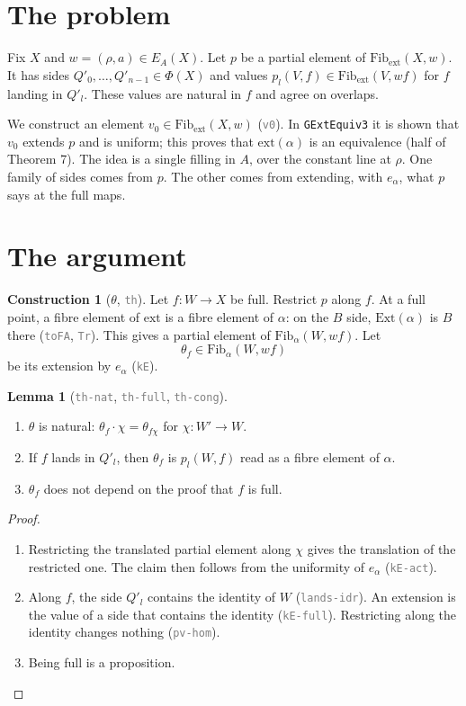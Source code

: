 \documentclass[11pt]{article}
\newcommand{\seg}[1]{\textcolor{gray}{\texttt{\small #1}}}
\newcommand{\Ext}{\mathrm{Ext}}
\newcommand{\ext}{\mathrm{ext}}
\newcommand{\Fib}{\mathrm{Fib}}
\theoremstyle{definition}
\newtheorem{lemma}[definition]{Lemma}
\newtheorem{construction}[definition]{Construction}
\theoremstyle{remark}
\begin{document}
\section*{The problem}

Fix $X$ and $w=(\rho,a)\in E_A(X)$. Let $p$ be a partial element of
$\Fib_{\ext}(X,w)$. It has sides $Q'_0,\dots,Q'_{n-1}\in\Phi(X)$ and
values $p_l(V,f)\in\Fib_{\ext}(V,wf)$ for $f$ landing in $Q'_l$. These
values are natural in $f$ and agree on overlaps.

We construct an element $v_0\in\Fib_{\ext}(X,w)$ (\seg{v0}). In
\texttt{GExtEquiv3} it is shown that $v_0$ extends $p$ and is uniform; this
proves that $\ext(\alpha)$ is an equivalence (half of Theorem 7). The idea
is a single filling in $A$, over the constant line at $\rho$. One family of
sides comes from $p$. The other comes from extending, with $e_\alpha$, what
$p$ says at the full maps.

\section*{The argument}

\begin{construction}[$\theta$, \seg{th}]
Let $f:W\to X$ be full. Restrict $p$ along $f$. At a full point, a fibre
element of $\ext$ is a fibre element of $\alpha$: on the $B$ side,
$\Ext(\alpha)$ is $B$ there (\seg{toFA}, \seg{Tr}). This gives a partial
element of $\Fib_\alpha(W,wf)$. Let
\[
\theta_f\in\Fib_\alpha(W,wf)
\]
be its extension by $e_\alpha$ (\seg{kE}).
\end{construction}

\begin{lemma}[\seg{th-nat}, \seg{th-full}, \seg{th-cong}]\label{lem:theta}
\leavevmode
\begin{enumerate}
\item $\theta$ is natural: $\theta_f\cdot\chi=\theta_{f\chi}$ for
  $\chi:W'\to W$.
\item If $f$ lands in $Q'_l$, then $\theta_f$ is $p_l(W,f)$ read as a fibre
  element of $\alpha$.
\item $\theta_f$ does not depend on the proof that $f$ is full.
\end{enumerate}
\end{lemma}

\begin{proof}
\begin{enumerate}
\item Restricting the translated partial element along $\chi$ gives the
  translation of the restricted one. The claim then follows from the
  uniformity of $e_\alpha$ (\seg{kE-act}).
\item Along $f$, the side $Q'_l$ contains the identity of $W$
  (\seg{lands-idr}). An extension is the value of a side that contains the
  identity (\seg{kE-full}). Restricting along the identity changes nothing
  (\seg{pv-hom}).
\item Being full is a proposition.
\end{enumerate}
\end{proof}
\end{document}
